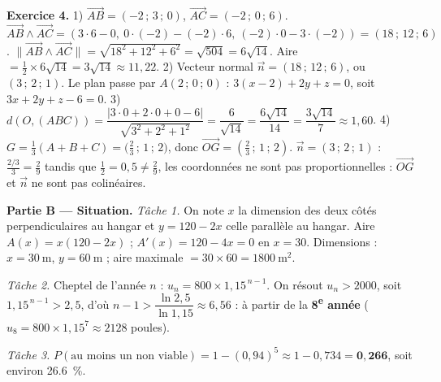 \noindent\textbf{Exercice 4.}
1) $\vec{AB}=(-2\,;\,3\,;\,0)$, $\vec{AC}=(-2\,;\,0\,;\,6)$.
$\vec{AB}\wedge\vec{AC}=(3\cdot6-0,\ 0\cdot(-2)-(-2)\cdot6,\ (-2)\cdot0-3\cdot(-2))=(18\,;\,12\,;\,6)$.
$\|\vec{AB}\wedge\vec{AC}\|=\sqrt{18^2+12^2+6^2}=\sqrt{504}=6\sqrt{14}$.
Aire $=\frac12\times6\sqrt{14}=3\sqrt{14}\approx11{,}22$.
2) Vecteur normal $\vec n=(18\,;\,12\,;\,6)$, ou $(3\,;\,2\,;\,1)$. Le plan passe par $A(2\,;\,0\,;\,0)$ :
$3(x-2)+2y+z=0$, soit $3x+2y+z-6=0$.
3) $d(O,(ABC))=\dfrac{|3\cdot0+2\cdot0+0-6|}{\sqrt{3^2+2^2+1^2}}=\dfrac{6}{\sqrt{14}}=\dfrac{6\sqrt{14}}{14}=\dfrac{3\sqrt{14}}{7}\approx1{,}60$.
4) $G=\frac13(A+B+C)=\big(\frac23\,;\,1\,;\,2\big)$, donc $\vec{OG}=(\frac23\,;\,1\,;\,2)$.
$\vec n=(3\,;\,2\,;\,1)$ : $\frac{2/3}{3}=\frac29$ tandis que $\frac12=0{,}5\ne\frac29$, les coordonnées
ne sont pas proportionnelles : $\vec{OG}$ et $\vec n$ ne sont pas colinéaires.

\smallskip
\noindent\textbf{Partie B — Situation.}
\emph{Tâche 1.} On note $x$ la dimension des deux côtés perpendiculaires au hangar et
$y=120-2x$ celle parallèle au hangar. Aire $A(x)=x(120-2x)$ ; $A'(x)=120-4x=0$ en $x=30$.
Dimensions : $x=\SI{30}{\metre}$, $y=\SI{60}{\metre}$ ; aire maximale $=30\times60=\SI{1800}{\metre\squared}$.

\emph{Tâche 2.} Cheptel de l'année $n$ : $u_n=800\times1{,}15^{\,n-1}$. On résout $u_n>2000$,
soit $1{,}15^{\,n-1}>2{,}5$, d'où $n-1>\dfrac{\ln 2{,}5}{\ln 1{,}15}\approx6{,}56$ : à partir de la
\textbf{8\textsuperscript{e} année} ($u_8=800\times1{,}15^{7}\approx2128$ poules).

\emph{Tâche 3.} $P(\text{au moins un non viable})=1-(0{,}94)^5\approx1-0{,}734=\mathbf{0{,}266}$,
soit environ \SI{26,6}{\percent}.
